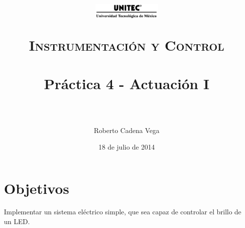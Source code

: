 



\title{
	\normalfont \normalsize
	\begin{figure}[h]
		\centering \includegraphics[width=0.3\textwidth]{../images/UNITEC.png}
	\end{figure}
	\textsc{Instrumentación y Control} \\ [25pt]
	\horrule{0.5pt} \\[0.4cm] %
	\huge Práctica 4 - Actuación I \\ %
	\horrule{2pt} \\[0.5cm] %
}

\author{Roberto Cadena Vega} %

\date{\normalsize 18 de julio de 2014} %




\maketitle %


\section{Objetivos}

	Implementar un sistema eléctrico simple, que sea capaz de controlar el brillo de un LED.


